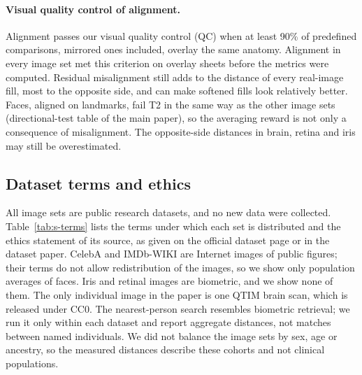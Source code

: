 \paragraph{Visual quality control of alignment.}
Alignment passes our visual quality control (QC) when at least 90\% of predefined comparisons, mirrored ones included, overlay the same anatomy.
Alignment in every image set met this criterion on overlay sheets before the metrics were computed.
Residual misalignment still adds to the distance of every real-image fill, most to the opposite side, and can make softened fills look relatively better.
Faces, aligned on landmarks, fail T2 in the same way as the other image sets (directional-test table of the main paper), so the averaging reward is not only a consequence of misalignment.
The opposite-side distances in brain, retina and iris may still be overestimated.

\subsection{Dataset terms and ethics}
All image sets are public research datasets, and no new data were collected.
Table~\ref{tab:s-terms} lists the terms under which each set is distributed and the ethics statement of its source, as given on the official dataset page or in the dataset paper.
CelebA and IMDb-WIKI are Internet images of public figures; their terms do not allow redistribution of the images, so we show only population averages of faces.
Iris and retinal images are biometric, and we show none of them.
The only individual image in the paper is one QTIM brain scan, which is released under CC0.
The nearest-person search resembles biometric retrieval; we run it only within each dataset and report aggregate distances, not matches between named individuals.
We did not balance the image sets by sex, age or ancestry, so the measured distances describe these cohorts and not clinical populations.

